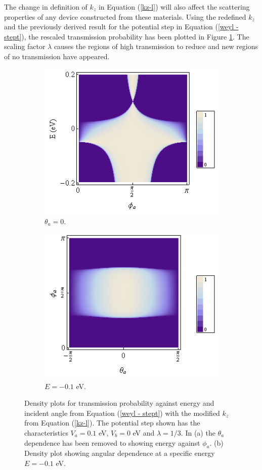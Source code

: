		The change in definition of $k_{z}$ in Equation (\ref{kz-l}) will also affect the scattering properties of any device constructed from these materials. Using the redefined $k_{z}$ and the previously derived result for the potential step in Equation (\ref{weyl - stept}), the rescaled transmission probability has been plotted in Figure \ref{step-l3}. The scaling factor $\lambda$ causes the regions of high transmission to reduce and new regions of no transmission have appeared.
		\begin{figure}[h]
			\begin{subfigure}[h]{0.5\textwidth}
				\centerline{\includegraphics[scale=0.55]{images/step-l3}}
				\caption{$\theta_{a}=0$.}
			\end{subfigure}
			\hspace{0.5cm}
			\begin{subfigure}[h]{0.5\textwidth}
				\centerline{\includegraphics[scale=0.55]{images/phi-theta-step}}
				\caption{$E=-0.1$ eV.}
			\end{subfigure}
			\caption{Density plots for transmission probability against energy and incident angle from Equation (\ref{weyl - stept}) with the modified $k_{z}$ from Equation (\ref{kz-l}). The potential step shown has the characteristics $V_{a}=0.1$ eV, $V_{b}=0$ eV and $\lambda = 1/3$. In (a) the $\theta_{a}$ dependence has been removed to showing energy against $\phi_{a}$. (b) Density plot showing angular dependence at a specific energy $E=-0.1$ eV.}
			\label{step-l3}
		\end{figure}	

